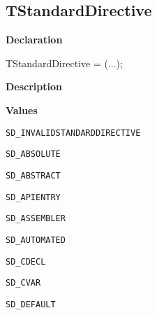 \documentclass{report}
\newif\ifpdf
\begin{document}
\subsection*{TStandardDirective}
\fi
\label{PasDoc_Tokenizer-TStandardDirective}
\begin{list}{}{
\setlength{\itemindent}{0cm}
\setlength{\listparindent}{0cm}
\setlength{\leftmargin}{\evensidemargin}
\addtolength{\leftmargin}{\tmplength}
\settowidth{\labelsep}{X}
\addtolength{\leftmargin}{\labelsep}
\setlength{\labelwidth}{\tmplength}
}
\item[\textbf{Declaration}\hfill]
\ifpdf
\begin{flushleft}
\fi
\begin{ttfamily}
TStandardDirective = (...);\end{ttfamily}

\ifpdf
\end{flushleft}
\fi

\par
\item[\textbf{Description}]
 \item[\textbf{Values}]
\begin{description}
\item[\texttt{SD{\_}INVALIDSTANDARDDIRECTIVE}] \label{PasDoc_Tokenizer-SD_INVALIDSTANDARDDIRECTIVE}
\index{}
 
\item[\texttt{SD{\_}ABSOLUTE}] \label{PasDoc_Tokenizer-SD_ABSOLUTE}
\index{}
 
\item[\texttt{SD{\_}ABSTRACT}] \label{PasDoc_Tokenizer-SD_ABSTRACT}
\index{}
 
\item[\texttt{SD{\_}APIENTRY}] \label{PasDoc_Tokenizer-SD_APIENTRY}
\index{}
 
\item[\texttt{SD{\_}ASSEMBLER}] \label{PasDoc_Tokenizer-SD_ASSEMBLER}
\index{}
 
\item[\texttt{SD{\_}AUTOMATED}] \label{PasDoc_Tokenizer-SD_AUTOMATED}
\index{}
 
\item[\texttt{SD{\_}CDECL}] \label{PasDoc_Tokenizer-SD_CDECL}
\index{}
 
\item[\texttt{SD{\_}CVAR}] \label{PasDoc_Tokenizer-SD_CVAR}
\index{}
 
\item[\texttt{SD{\_}DEFAULT}] \label{PasDoc_Tokenizer-SD_DEFAULT}
\index{}
 

\end{description}
\end{list}
\end{document}
